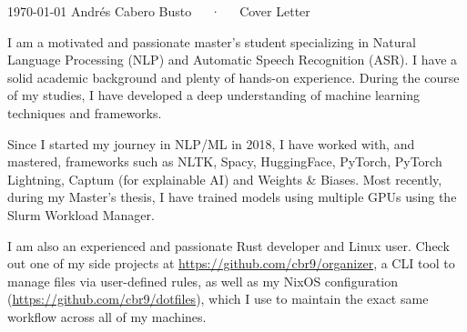\documentclass[11pt, a4paper]{awesome-cv}
\begin{document}
\makecvheader[R]

\makecvfooter
  {\today}
  {Andrés Cabero Busto~~~·~~~Cover Letter}
  {}

\makelettertitle

\begin{cvletter}

I am a motivated and passionate master's student specializing in Natural Language Processing (NLP) and Automatic Speech Recognition (ASR). I have a solid academic background and plenty of hands-on experience. During the course of my studies, I have developed a deep understanding of machine learning techniques and frameworks. 

Since I started my journey in NLP/ML in 2018, I have worked with, and mastered, frameworks such as NLTK, Spacy, HuggingFace, PyTorch, PyTorch Lightning, Captum (for explainable AI) and Weights \& Biases. Most recently, during my Master's thesis, I have trained models using multiple GPUs using the Slurm Workload Manager.

I am also an experienced and passionate Rust developer and Linux user. Check out one of my side projects at \url{https://github.com/cbr9/organizer}, a CLI tool to manage files via user-defined rules, as well as my NixOS configuration (\url{https://github.com/cbr9/dotfiles}), which I use to maintain the exact same workflow across all of my machines.



\end{cvletter}
\end{document}
